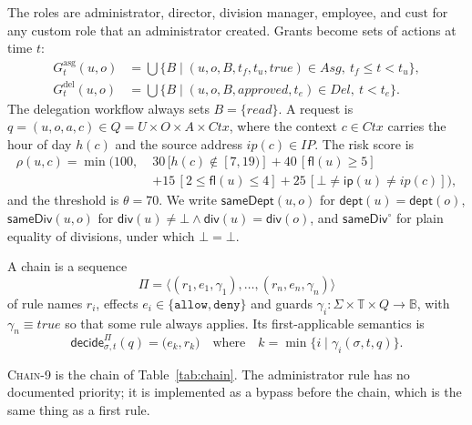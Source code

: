 \documentclass[sigconf,review,anonymous]{acmart}
\newcommand{\chain}{\textsc{Chain-9}\xspace}
\newcommand{\Gasg}{G^{\mathrm{asg}}}
\newcommand{\Gdel}{G^{\mathrm{del}}}
\newcommand{\sameDept}{\mathsf{sameDept}}
\newcommand{\sameDiv}{\mathsf{sameDiv}}
\newcommand{\decide}{\mathsf{decide}}
\newcommand{\allowv}{\mathtt{allow}}
\newcommand{\denyv}{\mathtt{deny}}
\begin{document}
The roles are administrator, director, division manager, employee, and $\mathrm{cust}$ for any custom role
that an administrator created. Grants become sets of actions at time $t$:
\begin{align*}
\Gasg_t(u,o) &= \textstyle\bigcup\{B \mid (u,o,B,t_f,t_u,\mathit{true})\in\mathit{Asg},\ t_f\le t<t_u\},\\
\Gdel_t(u,o) &= \textstyle\bigcup\{B \mid (u,o,B,\mathit{approved},t_e)\in\mathit{Del},\ t<t_e\}.
\end{align*}
The delegation workflow always sets $B=\{\mathit{read}\}$. A request is $q=(u,o,a,c)\in Q=U\times O\times A\times
\mathit{Ctx}$, where the context $c\in\mathit{Ctx}$ carries the hour of day $h(c)$ and the source address
$\mathit{ip}(c)\in\mathit{IP}$. The risk score is
\begin{align*}
\rho(u,c)=\min\bigl(100,\;&30\,[h(c)\notin[7,19)]+40\,[\mathsf{fl}(u)\ge5]\\
&+15\,[2\le\mathsf{fl}(u)\le4]+25\,[\bot\neq\mathsf{ip}(u)\neq\mathit{ip}(c)]\bigr),
\end{align*}
and the threshold is $\theta=70$. We write $\sameDept(u,o)$ for
$\mathsf{dept}(u)=\mathsf{dept}(o)$, $\sameDiv(u,o)$ for $\mathsf{div}(u)\neq\bot\wedge\mathsf{div}(u)=\mathsf{div}(o)$,
and $\sameDiv^\circ$ for plain equality of divisions, under which $\bot=\bot$.

\begin{definition}\label{def:chain}
A chain is a sequence
\[
\Pi=\langle(r_1,e_1,\gamma_1),\dots,(r_n,e_n,\gamma_n)\rangle
\]
of rule names $r_i$, effects $e_i\in\{\allowv,\denyv\}$ and guards $\gamma_i:\Sigma\times\mathbb{T}\times Q\to\mathbb{B}$,
with $\gamma_n\equiv\mathit{true}$ so that some rule always applies.
Its first-applicable semantics is
\[
\decide^\Pi_{\sigma,t}(q)=\bigl(e_k,r_k\bigr)\quad\text{where}\quad k=\min\{i\mid\gamma_i(\sigma,t,q)\}.
\]
\end{definition}

\chain is the chain of Table~\ref{tab:chain}. The administrator rule has no documented priority; it is
implemented as a bypass before the chain, which is the same thing as a first rule.
\end{document}

